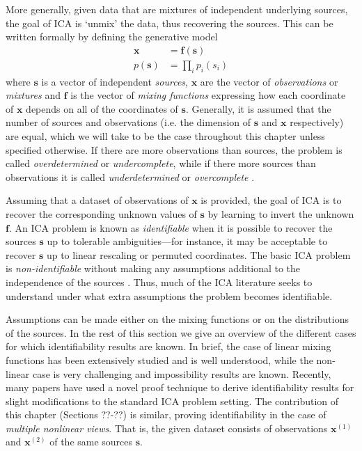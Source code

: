 More generally, given data that are mixtures of independent underlying sources, the goal of ICA is `unmix' the data, thus recovering the sources.
This can be written formally by defining the generative model
\begin{align*}
\bm{x} &= \bm{f}(\bm{s}) \\
p(\bm{s}) &= \prod_{i} p_i(s_i)
\end{align*}
where $\bm{s}$ is a vector of independent \emph{sources}, $\bm{x}$ are the vector of \emph{observations} or \emph{mixtures} and $\bm{f}$ is the vector of \emph{mixing functions} expressing how each coordinate of $\bm{x}$ depends on all of the coordinates of $\bm{s}$. 
Generally, it is assumed that the number of sources and observations (i.e. the dimension of $\bm{s}$ and $\bm{x}$ respectively) are equal, which we will take to be the case throughout this chapter unless specified otherwise. 
If there are more observations than sources, the problem is called \emph{overdetermined} or \emph{undercomplete}, while if there more sources than observations it is called \emph{underdetermined} or \emph{overcomplete} \cite{citation_needed}.

Assuming that a dataset of observations of $\bm{x}$ is provided, the goal of ICA is to recover the corresponding unknown values of $\bm{s}$ by learning to invert the unknown $\bm{f}$.
An ICA problem is known as \emph{identifiable} when it is possible to recover the sources $\bm{s}$ up to tolerable ambiguities---for instance, it may be acceptable to recover $\bm{s}$ up to linear rescaling or permuted coordinates.
The basic ICA problem is \emph{non-identifiable} without making any assumptions additional to the independence of the sources \cite{aapo}.
Thus, much of the ICA literature seeks to understand under what extra assumptions the problem becomes identifiable. 

Assumptions can be made either on the mixing functions or on the distributions of the sources.
In the rest of this section we give an overview of the different cases for which identifiability results are known. 
In brief, the case of linear mixing functions has been extensively studied and is well understood, while the non-linear case is very challenging and impossibility results are known.
Recently, many papers have used a novel proof technique to derive identifiability results for slight modifications to the standard ICA problem setting.
The contribution of this chapter (Sections ??-??) is similar, proving identifiability in the case of \emph{multiple nonlinear views}. 
That is, the given dataset consists of observations $\bm{x}^{(1)}$ and $\bm{x}^{(2)}$ of the same sources $\bm{s}$.



